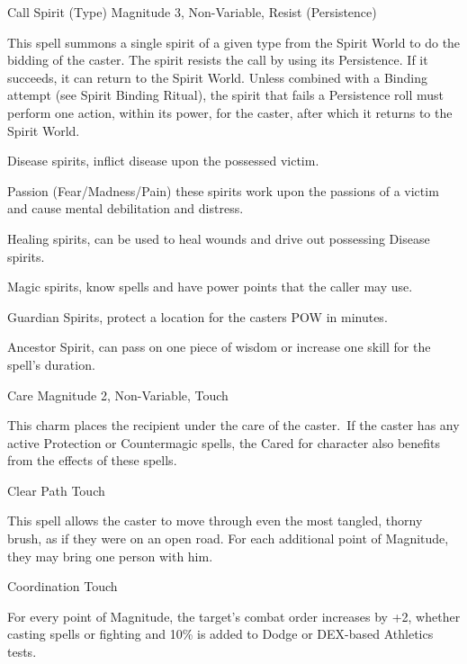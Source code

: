 \begin{rpg-spell}
{Call Spirit (Type)}
{Magnitude 3, Non-Variable, Resist (Persistence)}

This spell summons a single spirit of a given type from the Spirit World to do the bidding of the caster. The spirit resists the call by using its Persistence. If it succeeds, it can return to the Spirit World. Unless combined with a Binding attempt (see Spirit Binding Ritual), the spirit that fails a Persistence roll must perform one action, within its power, for the caster, after which it returns to the Spirit World.

\begin{rpg-list}
\item Disease spirits, inflict disease upon the possessed victim.
\item Passion (Fear/Madness/Pain) these spirits work upon the passions of a victim and cause mental debilitation and distress.
\item Healing spirits, can be used to heal wounds and drive out possessing Disease spirits.
\item Magic spirits, know spells and have power points that the caller may use.
\item Guardian Spirits, protect a location for the casters POW in minutes.
\item Ancestor Spirit, can pass on one piece of wisdom or increase one skill for the spell's duration.
\end{rpg-list}
\end{rpg-spell}

 
\begin{rpg-spell}
{Care}
{Magnitude 2, Non-Variable, Touch}

This charm places the recipient under the care of the caster. If the caster has any active Protection or Countermagic spells, the Cared for character also benefits from the effects of these spells.
\end{rpg-spell}

\begin{rpg-spell}
{Clear Path}
{Touch}

This spell allows the caster to move through even the most tangled, thorny brush, as if they were on an open road. For each additional point of Magnitude, they may bring one person with him. 
\end{rpg-spell}


\begin{rpg-spell}
{Coordination}
{Touch}

For every point of Magnitude, the target’s combat order increases by +2, whether casting spells or fighting and 10\% is added to Dodge or DEX-based Athletics tests. 
\end{rpg-spell}


